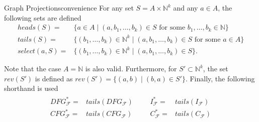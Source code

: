 \begin{notation}{Graph Projections}{convenience}
    For any set $S=A\times\mathbb N^k$ and any $a\in A$, the following sets are
    defined
    \begin{align*}
        heads(S)={}&\{a\in A\mid (a,b_1,\dots,b_k)\in S\text{ for some }b_1,\dots,b_k\in\mathbb N\}\\
        tails(S)={}&\{(b_1,\dots,b_k)\in\mathbb N^k\mid (a,b_1,\dots,b_k)\in S\text{ for some }a\in A\}\\
        select(a,S)={}&\{(b_1,\dots,b_k)\in\mathbb N^k\mid (a,b_1,\dots,b_k)\in S\}.
    \end{align*}

    Note that the case $A=\mathbb N$ is also valid.
    Furthermore, for $S'\subset\mathbb N^k$, the set $rev(S')$ is defined as
    $rev(S')=\{(a,b)\mid(b,a)\in S'\}$.
    Finally, the following shorthand is used
    \begin{align*}
        \begin{aligned}
        DFG_\mathcal F^*={}&tails(DFG_\mathcal F)\\
        CFG_\mathcal F^*={}&tails(CFG_\mathcal F)
        \end{aligned}&&
        \begin{aligned}
        I_\mathcal F^*={}&tails(I_\mathcal F)\\
        C_\mathcal F^*={}&tails(C_\mathcal F)
        \end{aligned}
    \end{align*}
\end{notation}